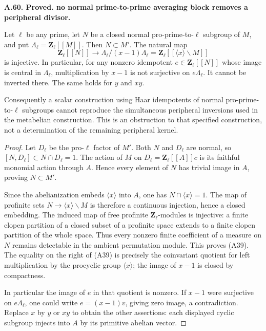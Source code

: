 \documentclass[11pt,oneside]{article}
\makeatletter
\newcounter{statementanchor}
\newenvironment{statement}[3]{%
 \refstepcounter{statementanchor}\def\@currentlabel{#1}%
 \par\addvspace{9pt}\noindent
 \textbf{#1. #2. #3.}\par\nobreak\noindent\ignorespaces
}{\par\addvspace{5pt}}
\makeatother
\begin{document}
\begin{statement}{A.60}{Proved}{no normal prime-to-prime averaging block removes a peripheral divisor}
\label{st:A.60}
\label{A:haar-block-obstruction}
Let $\ell$ be any prime, let $N$ be a closed normal
pro-prime-to-$\ell$ subgroup of $M$, and put
$\Lambda_\ell=\mathbf Z_\ell[[M]]$.
Then $N\subset M'$. The natural map
\[
 \mathbf Z_\ell[[N]]\longrightarrow
 \Lambda_\ell/(x-1)\Lambda_\ell
       =\mathbf Z_\ell[[\langle x\rangle\backslash M]]       \tag{A39}
\]
is injective. In particular, for any nonzero
idempotent $e\in\mathbf Z_\ell[[N]]$ whose image is
central in $\Lambda_\ell$, multiplication
by $x-1$ is not surjective on $e\Lambda_\ell$.
It cannot be inverted there. The same holds for
$y$ and $xy$.

Consequently a scalar construction using Haar
idempotents of normal pro-prime-to-$\ell$ subgroups
cannot reproduce the simultaneous peripheral
inversions used in the metabelian construction.
This is an obstruction to that specified construction,
not a determination of the remaining peripheral kernel.
\end{statement}
\begin{proof}
Let $D_\ell$ be the pro-$\ell$ factor of $M'$.
Both $N$ and $D_\ell$ are normal, so
$[N,D_\ell]\subset N\cap D_\ell=1$.
The action of $M$ on
$D_\ell=\mathbf Z_\ell[[A]]c$ is its faithful
monomial action through $A$. Hence every element
of $N$ has trivial image in $A$, proving
$N\subset M'$.

Since the abelianization embeds
$\langle x\rangle$ into $A$, one has
$N\cap\langle x\rangle=1$. The map of profinite
sets $N\to\langle x\rangle\backslash M$ is therefore
a continuous injection, hence a closed embedding.
The induced map of free profinite
$\mathbf Z_\ell$-modules is injective: a finite
clopen partition of a closed subset of a profinite
space extends to a finite clopen partition of the
whole space. Thus every nonzero finite coefficient
of a measure on $N$ remains detectable in the
ambient permutation module. This proves (A39).
The equality on the right of (A39) is precisely
the coinvariant quotient for left multiplication
by the procyclic group $\langle x\rangle$;
the image of $x-1$ is closed by compactness.

In particular the image of $e$ in that quotient
is nonzero. If $x-1$ were surjective on
$e\Lambda_\ell$, one could write
$e=(x-1)v$, giving zero image, a contradiction.
Replace $x$ by $y$ or $xy$ to obtain the other
assertions: each displayed cyclic subgroup
injects into $A$ by its primitive abelian vector.
\end{proof}
\end{document}
